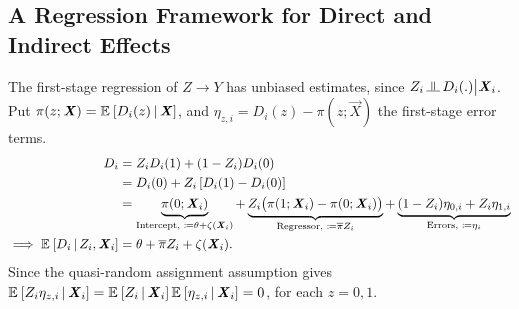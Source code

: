 \subsection{A Regression Framework for Direct and Indirect Effects}
\label{appendix:regression-model}
The first-stage regression of $Z \to Y$ has unbiased estimates, since $Z_i \indep D_i(.) \big| \vec X_i$.
Put $\pi(z; \boldsymbol{\mathit{X}}) = \mathbb{E}_{} \left[ D_i(z) \, \middle\vert \, \boldsymbol{\mathit{X}} \right]$, and $\eta_{z, i} = D_i(z) - \pi(z; \vec X)$ the first-stage error terms.
\begin{align*}
    D_i &= Z_i D_i(1) + (1 - Z_i) D_i(0) \\
        &= D_i(0) +
            Z_i \left[ D_i(1) - D_i(0) \right] \\
        &= \underbrace{\pi(0; \boldsymbol{\mathit{X}}_i) 
        }_{\text{Intercept, } \coloneqq \theta + \zeta(\boldsymbol{\mathit{X}}_i)} +
            \underbrace{Z_i \big( \pi(1; \boldsymbol{\mathit{X}}_i) - \pi(0; \boldsymbol{\mathit{X}}_i) \big)}_{
                \text{Regressor, } \coloneqq \overline{\pi} Z_i }
        + \underbrace{(1- Z_i) \eta_{0,i} + Z_i \eta_{1,i}}_{
            \text{Errors, } \coloneqq \eta_i} \\
    \implies \mathbb{E}_{} \left[ D_i \, \middle\vert \, Z_i, \boldsymbol{\mathit{X}}_i \right]
        &= \theta + \overline{\pi} Z_i + \zeta(\boldsymbol{\mathit{X}}_i).
\end{align*}
Since the quasi-random assignment assumption gives $\mathbb{E}_{} \left[ Z_i \eta_{z,i} \, \middle\vert \, \boldsymbol{\mathit{X}}_i \right] = \mathbb{E}_{} \left[ Z_i \, \middle\vert \, \boldsymbol{\mathit{X}}_i \right] \mathbb{E}_{} \left[ \eta_{z,i} \, \middle\vert \, \boldsymbol{\mathit{X}}_i \right] = 0$, for each $z =0,1$.

